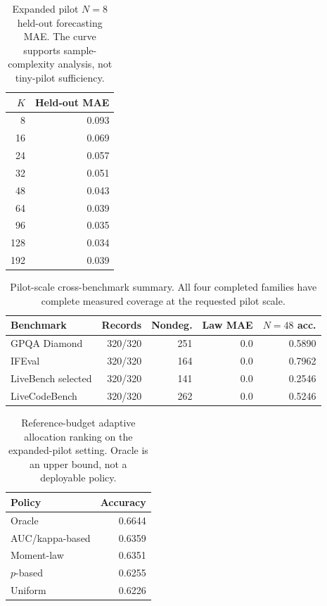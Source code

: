 \begin{table}[t]
\centering
\caption{Expanded pilot $N=8$ held-out forecasting MAE. The curve supports
sample-complexity analysis, not tiny-pilot sufficiency.}
\label{tab:pilot-values}
\begin{tabular}{r r}
\toprule
$K$ & Held-out MAE \\
\midrule
8 & 0.093 \\
16 & 0.069 \\
24 & 0.057 \\
32 & 0.051 \\
48 & 0.043 \\
64 & 0.039 \\
96 & 0.035 \\
128 & 0.034 \\
192 & 0.039 \\
\bottomrule
\end{tabular}
\end{table}

\begin{table}[t]
\centering
\caption{Pilot-scale cross-benchmark summary. All four completed families
have complete measured coverage at the requested pilot scale.}
\label{tab:cross-values}
\begin{tabular}{l r r r r}
\toprule
Benchmark & Records & Nondeg. & Law MAE & $N=48$ acc. \\
\midrule
GPQA Diamond & 320/320 & 251 & 0.0 & 0.5890 \\
IFEval & 320/320 & 164 & 0.0 & 0.7962 \\
LiveBench selected & 320/320 & 141 & 0.0 & 0.2546 \\
LiveCodeBench & 320/320 & 262 & 0.0 & 0.5246 \\
\bottomrule
\end{tabular}
\end{table}

\begin{table}[t]
\centering
\caption{Reference-budget adaptive allocation ranking on the expanded-pilot
setting. Oracle is an upper bound, not a deployable policy.}
\label{tab:allocation-values}
\begin{tabular}{l r}
\toprule
Policy & Accuracy \\
\midrule
Oracle & 0.6644 \\
AUC/kappa-based & 0.6359 \\
Moment-law & 0.6351 \\
$p$-based & 0.6255 \\
Uniform & 0.6226 \\
\bottomrule
\end{tabular}
\end{table}

